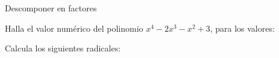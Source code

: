 \documentclass[addpoints,spanish, 12pt,a4paper]{exam}
\begin{document}
        \begin{questions}
        \question Descomponer en factores
        \begin{multicols}{1} 
        \end{multicols}
        \question Halla el valor numérico del polinomio $x^4-2x^3-x^2+3$,  para los valores:
        \begin{multicols}{1} 
        \end{multicols}
        \question Calcula los siguientes radicales:
        \begin{multicols}{1} 
        \end{multicols}

\end{questions}
\end{document}
